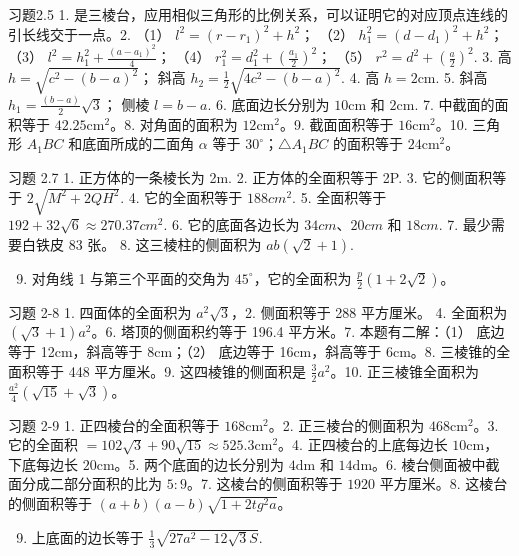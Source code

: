习题2.5 1.
是三棱台，应用相似三角形的比例关系，可以证明它的对应顶点连线的引长线交于一点。2.
（1） \(l^{2} = (r - r_{1})^{2} + h^{2}\)； （2）
\(h_{1}^{2} = (d - d_{1})^{2} + h^{2}\)； （3）
\(l^{2} = h_{1}^{2} + \frac{(a - a_{1})^{2}}{4}\)； （4）
\(r_{1}^{2} = d_{1}^{2} + \left(\frac{a_{1}}{2}\right)^{2}\)； （5）
\(r^{2} = d^{2} + \left(\frac{a}{2}\right)^{2}\). 3. 高
\(h = \sqrt{c^{2} - (b - a)^{2}}\)； 斜高
\(h_{2} = \frac{1}{2}\sqrt{4c^{2} - (b - a)^{2}}\). 4. 高
\(h = 2\mathrm{cm}\). 5. 斜高 \(h_{1} = \frac{(b - a)}{2}\sqrt{3}\)；
侧棱 \(l = b - a\). 6. 底面边长分别为 \(10\mathrm{cm}\) 和
\(2\mathrm{cm}\). 7. 中截面的面积等于 \(42.25\mathrm{cm}^2\)。8.
对角面的面积为 \(12\mathrm{cm}^2\)。9. 截面面积等于
\(16\mathrm{cm}^2\)。10. 三角形 \(A_1BC\) 和底面所成的二面角 \(\alpha\)
等于 \(30^\circ\)；\(\triangle A_1BC\) 的面积等于 \(24\mathrm{cm}^2\)。

习题 2.7 1. 正方体的一条棱长为 2m. 2. 正方体的全面积等于 2P. 3.
它的侧面积等于 \(2\sqrt{M^2 + 2QH^2}\). 4. 它的全面积等于 \(188cm^2\).
5. 全面积等于 \(192 + 32\sqrt{6} \approx 270.37cm^2\). 6.
它的底面各边长为 \(34cm\)、\(20cm\) 和 \(18cm\). 7. 最少需要白铁皮 83
张。 8. 这三棱柱的侧面积为 \(ab(\sqrt{2} + 1)\).

\begin{enumerate}
\setcounter{enumi}{8}
\item
  对角线 1 与第三个平面的交角为 \(45^{\circ}\)，它的全面积为
  \(\frac{p}{2}(1 + 2\sqrt{2})\)。
\end{enumerate}

习题 2-8 1. 四面体的全面积为 \(a^{2}\sqrt{3}\)，2. 侧面积等于 288
平方厘米。 4. 全面积为 \((\sqrt{3}+1)a^{2}\)。6. 塔顶的侧面积约等于
196.4 平方米。7. 本题有二解：（1） 底边等于 12cm，斜高等于 8cm；（2）
底边等于 16cm，斜高等于 6cm。8. 三棱锥的全面积等于 448 平方厘米。9.
这四棱锥的侧面积是 \(\frac{3}{2}a^{2}\)。10. 正三棱锥全面积为
\(\frac{a^{2}}{4}(\sqrt{15}+\sqrt{3})\)。

习题 2-9 1. 正四棱台的全面积等于 \(168\mathrm{cm}^2\)。2.
正三棱台的侧面积为 \(468\mathrm{cm}^2\)。3. 它的全面积
\(= 102\sqrt{3} + 90\sqrt{15} \approx 525.3\mathrm{cm}^2\)。4.
正四棱台的上底每边长 \(10\mathrm{cm}\)，下底每边长 \(20\mathrm{cm}\)。5.
两个底面的边长分别为 \(4\mathrm{dm}\) 和 \(14\mathrm{dm}\)。6.
棱台侧面被中截面分成二部分面积的比为 \(5:9\)。7. 这棱台的侧面积等于
\(1920\) 平方厘米。8. 这棱台的侧面积等于
\((a + b)(a - b)\sqrt{1 + 2tg^2 a}\)。

\begin{enumerate}
\setcounter{enumi}{8}
\item
  上底面的边长等于 \(\frac{1}{3} \sqrt{27a^2 - 12\sqrt{3}S}\).
\end{enumerate}

